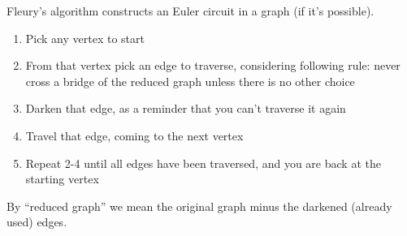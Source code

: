 \documentclass[12pt]{article}
\begin{document}
Fleury's algorithm constructs an Euler circuit in a graph (if it's possible). \\
\begin{enumerate}
\item Pick any vertex to start
\item From that vertex pick an edge to traverse, considering following rule: never cross a bridge of the reduced graph unless there is no other choice 
\item Darken that edge, as a reminder that you can't traverse it again 
\item Travel that edge, coming to the next vertex 
\item Repeat 2-4 until all edges have been traversed, and you are back at the starting vertex
\end{enumerate}
By ``reduced graph'' we mean the original graph minus the darkened (already used) edges.
\end{document}
